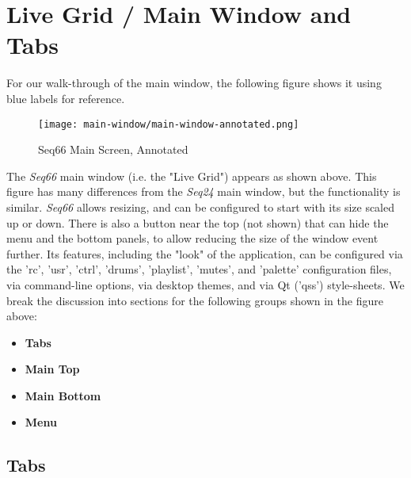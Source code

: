 %
%
%

\section{Live Grid / Main Window and Tabs}
\label{sec:live_grid}

   For our walk-through of the main window, the following figure
   shows it using blue labels for reference.

\begin{figure}[H]
   \centering 
   \texttt{[image: main-window/main-window-annotated.png]}
   \caption{Seq66 Main Screen, Annotated}
   \label{fig:main_screen_annotated}
\end{figure}

   The \textsl{Seq66} main window (i.e. the "Live Grid") appears as shown above.
   This figure has many differences from the \textsl{Seq24} main window,
   but the functionality is similar.
   \textsl{Seq66} allows resizing, and can
   be configured to start with its size scaled up or down.
   There is also a button near the top (not shown) that can
   hide the menu and the bottom panels, to allow reducing the
   size of the window event further.
   Its features, including the "look" of the application,
   can be configured via the 'rc', 'usr', 'ctrl', 'drums', 'playlist', 'mutes',
   and 'palette' configuration files, via command-line options, via
   desktop themes, and via Qt ('qss') style-sheets.
   We break the discussion into sections for the following
   groups shown in the figure above:

   \begin{itemize}
      \item \textbf{Tabs}
      \item \textbf{Main Top}
      \item \textbf{Main Bottom}
      \item \textbf{Menu}
   \end{itemize}

\subsection{Tabs}
\label{subsec:introduction_main_tabs}


